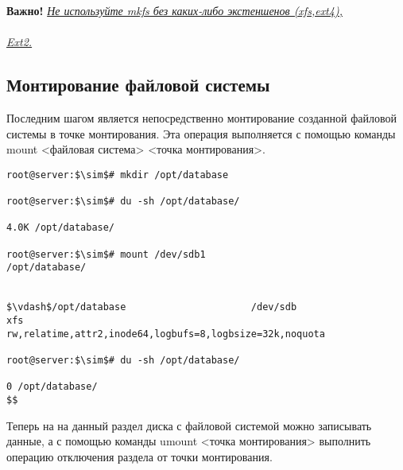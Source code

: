 \documentclass[14pt, a4paper]{article}
\begin{document}
\vspace{0.3cm}

\textbf{Важно!} \underline{\textit{Не используйте mkfs без каких-либо экстеншенов (xfs,ext4),}} \\
\underline{} \\
\underline{\textit{Ext2.}}

\newpage

\subsection*{Монтирование файловой системы} 

Последним шагом является непосредственно монтирование созданной файловой системы в точке
монтирования. Эта операция выполняется с помощью команды \colorbox{backcolour}{mount <файловая система>
<точка монтирования>}.

\vspace{0.3cm}

\begin{lstlisting}[mathescape=true]
root@server:$\sim$# mkdir /opt/database

root@server:$\sim$# du -sh /opt/database/

4.0K /opt/database/

root@server:$\sim$# mount /dev/sdb1
/opt/database/


$\vdash$/opt/database                      /dev/sdb                        xfs
rw,relatime,attr2,inode64,logbufs=8,logbsize=32k,noquota

root@server:$\sim$# du -sh /opt/database/

0 /opt/database/
$$
\end{lstlisting}
\vspace{0.2cm}

Теперь на на данный раздел диска с файловой системой можно записывать данные, а с помощью
команды \colorbox{backcolour}{umount <точка монтирования>} выполнить операцию отключения раздела от точки
монтирования.
\end{document}
